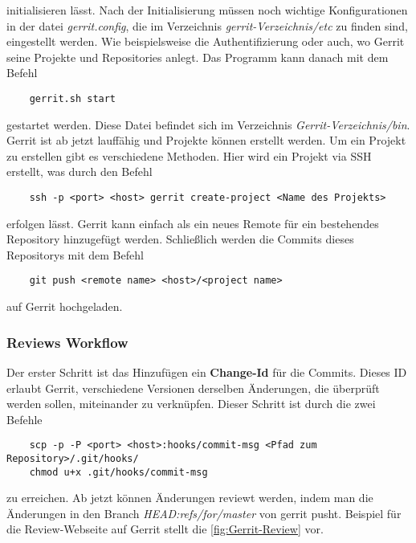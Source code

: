 \noindent initialisieren lässt. Nach der Initialisierung müssen noch wichtige Konfigurationen in der datei \textit{gerrit.config}, die im Verzeichnis \textit{gerrit-Verzeichnis/etc} zu finden sind, eingestellt werden. Wie beispielsweise die Authentifizierung oder auch, wo Gerrit seine Projekte und Repositories anlegt. Das Programm kann danach mit dem Befehl

{\color{blue} 
\begin{verbatim}
	gerrit.sh start
\end{verbatim}}

\noindent gestartet werden. Diese Datei befindet sich im Verzeichnis \textit{Gerrit-Verzeichnis/bin}. Gerrit ist ab jetzt lauffähig und Projekte können erstellt werden. Um ein Projekt zu erstellen gibt es verschiedene Methoden. Hier wird ein Projekt via SSH erstellt, was durch den Befehl

{\color{blue}
\begin{verbatim}
	ssh -p <port> <host> gerrit create-project <Name des Projekts>
\end{verbatim}}

\noindent erfolgen lässt. Gerrit kann einfach als ein neues Remote für ein bestehendes Repository hinzugefügt werden. Schließlich werden die Commits dieses Repositorys mit dem Befehl

{\color{blue}
\begin{verbatim}
	git push <remote name> <host>/<project name>
\end{verbatim}}

\noindent auf Gerrit hochgeladen.

\subsubsection{Reviews Workflow}
\label{subsubsec:Reviews Workflow bei Gerrit}

Der erster Schritt ist das Hinzufügen ein \textbf{Change-Id} für die Commits. Dieses ID erlaubt Gerrit, verschiedene Versionen derselben Änderungen, die überprüft werden sollen, miteinander zu verknüpfen. Dieser Schritt ist durch die zwei Befehle

{\color{blue}
\begin{verbatim}
	scp -p -P <port> <host>:hooks/commit-msg <Pfad zum Repository>/.git/hooks/
	chmod u+x .git/hooks/commit-msg
\end{verbatim}}

\noindent zu erreichen. Ab jetzt können Änderungen reviewt werden, indem man die Änderungen in den Branch \textit{HEAD:refs/for/master} von gerrit pusht. Beispiel für die Review-Webseite auf Gerrit stellt die \cref{fig:Gerrit-Review} vor.

